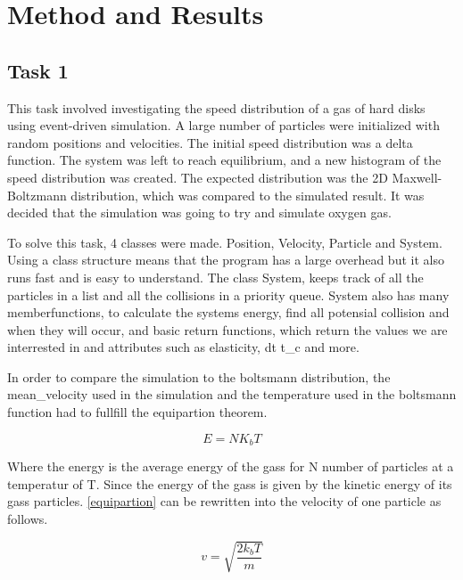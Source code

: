 \section{Method and Results}

\subsection{Task 1}

This task involved investigating the speed distribution of a gas of 
hard disks using event-driven simulation. A large number of particles 
were initialized with random positions and velocities. 
The initial speed distribution was a delta function. 
The system was left to reach equilibrium, and a new histogram 
of the speed distribution was created. The expected distribution 
was the 2D Maxwell-Boltzmann distribution, which was compared to 
the simulated result. It was decided that the simulation was going 
to try and simulate oxygen gas. 

To solve this task, 4 classes were made. Position, Velocity, 
Particle and System. Using a class structure means that the 
program has a large overhead but it also runs fast and is easy 
to understand. The class System, keeps track of all the particles 
in a list and all the collisions in a priority queue. System also 
has many memberfunctions, to calculate the systems energy, find all 
potensial collision and when they will occur, and basic return functions, 
which return the values we are interrested in and attributes such as 
elasticity, dt t\_c and more.

In order to compare the simulation to the boltsmann distribution, 
the mean\_velocity used in the simulation and the temperature used 
in the boltsmann function had to fullfill the equipartion theorem. 

\begin{equation}
E = N K_b T
\label{equipartion}
\end{equation}



Where the energy is the average energy of the gass for N 
number of particles at a temperatur of T. Since the energy of 
the gass is given by the kinetic energy of its gass particles. 
\autoref{equipartion} can be rewritten into the velocity of one 
particle as follows.

\begin{equation}
    v = \sqrt{\frac{2 k_b T}{m}}
\label{rms}
\end{equation}


